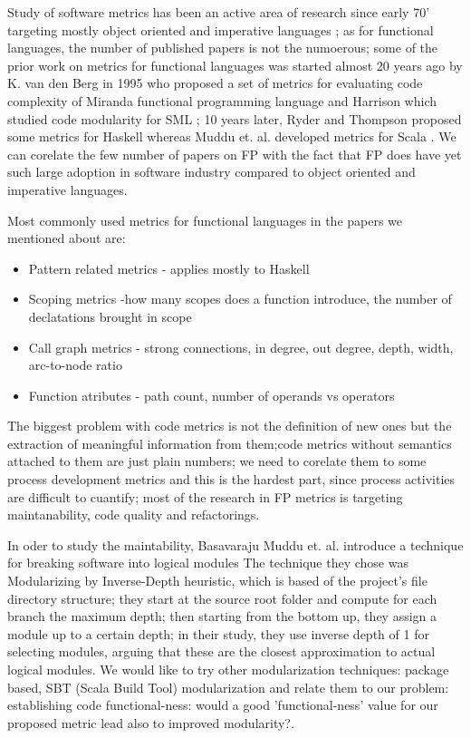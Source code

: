 \documentclass{article}
\begin{document}
Study of software metrics has been an active area of research since early 70' targeting mostly object oriented and imperative languages \cite{RyderT05:TFP_2005_Intellect}; as for functional languages, the number of published papers is not the numoerous; some of the prior work on metrics for functional languages was started almost 20 years ago by K. van den Berg in 1995 \cite{DBLP:journals/infsof/BergB95} who proposed a set of metrics for evaluating code complexity of Miranda functional programming language and Harrison which studied code modularity for SML \cite{eps250597}; 10 years later, Ryder and Thompson proposed some metrics for Haskell \cite{RyderT05:TFP_2005_Intellect} whereas  Muddu et. al. developed metrics for Scala \cite{DBLP:conf/icse/MudduABP13}. We can corelate the few number of papers on FP with the fact that FP does have yet such large adoption in software industry compared to object oriented and imperative languages. \par

Most commonly used metrics for functional languages in the papers we mentioned about are:

\begin{itemize}
\item Pattern related metrics - applies mostly to Haskell
\item Scoping metrics -how many scopes does a function introduce, the number of declatations brought in scope
\item Call graph metrics - strong connections, in degree, out degree, depth, width, arc-to-node ratio
\item Function atributes - path count, number of operands vs operators
\end{itemize}

The biggest problem with code metrics is not the definition of new ones but the extraction of  meaningful information from them;code metrics without semantics attached to them are just plain numbers; we need to corelate them to some process development metrics and this is the hardest part, since process activities are difficult to cuantify; most of the research in FP metrics is targeting maintanability, code quality and refactorings.  \par

In oder to study the maintability, Basavaraju Muddu et. al. introduce a technique for breaking software into logical modules \cite{DBLP:conf/icse/MudduABP13} The technique they chose was Modularizing by  Inverse-Depth heuristic, which is based of the project's file directory structure; they start at the source root folder and compute for each branch the maximum depth; then starting from the bottom up, they assign a module up to a certain depth; in their study, they use inverse depth of 1 for selecting modules, arguing that these are the closest approximation to actual logical modules. We would like to try other modularization techniques: package based, SBT (Scala Build Tool)  modularization and relate them to our problem: establishing code functional-ness: would a good 'functional-ness' value for our proposed metric lead also to improved modularity?.\par
\end{document}
